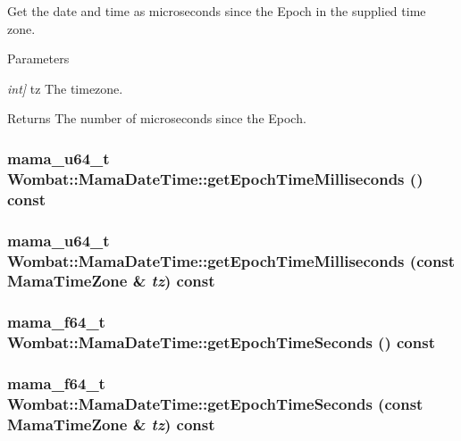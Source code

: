 Get the date and time as microseconds since the Epoch in the supplied time zone. 
\begin{DoxyParams}{Parameters}
\item[{\em int\mbox{]}}]tz The timezone. \end{DoxyParams}
\begin{DoxyReturn}{Returns}
The number of microseconds since the Epoch. 
\end{DoxyReturn}
\hypertarget{classWombat_1_1MamaDateTime_afef0998864cc6aa6a9bc02ec560f4406}{
\subsubsection[{getEpochTimeMilliseconds}]{\setlength{\rightskip}{0pt plus 5cm}mama\_\-u64\_\-t Wombat::MamaDateTime::getEpochTimeMilliseconds () const}}
\label{classWombat_1_1MamaDateTime_afef0998864cc6aa6a9bc02ec560f4406}
\hypertarget{classWombat_1_1MamaDateTime_ae558d0f45e1fceb29bb0671f9c20dc2f}{
\subsubsection[{getEpochTimeMilliseconds}]{\setlength{\rightskip}{0pt plus 5cm}mama\_\-u64\_\-t Wombat::MamaDateTime::getEpochTimeMilliseconds (const {\bf MamaTimeZone} \& {\em tz}) const}}
\label{classWombat_1_1MamaDateTime_ae558d0f45e1fceb29bb0671f9c20dc2f}
\hypertarget{classWombat_1_1MamaDateTime_acab5e332634fb075f7e0b93d7b1afbcb}{
\subsubsection[{getEpochTimeSeconds}]{\setlength{\rightskip}{0pt plus 5cm}mama\_\-f64\_\-t Wombat::MamaDateTime::getEpochTimeSeconds () const}}
\label{classWombat_1_1MamaDateTime_acab5e332634fb075f7e0b93d7b1afbcb}
\hypertarget{classWombat_1_1MamaDateTime_a94e87557d8bc08a050933b166c79cc44}{
\subsubsection[{getEpochTimeSeconds}]{\setlength{\rightskip}{0pt plus 5cm}mama\_\-f64\_\-t Wombat::MamaDateTime::getEpochTimeSeconds (const {\bf MamaTimeZone} \& {\em tz}) const}}
